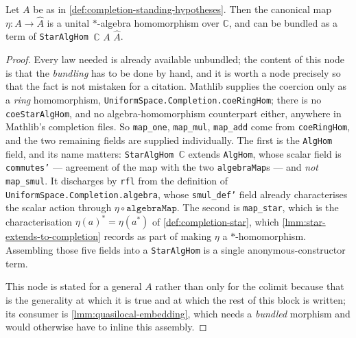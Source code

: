 \begin{lemma}
    \label{lmm:completion-coe-star-alg-hom}
    \leanok
    Let $A$ be as in \ref{def:completion-standing-hypotheses}. Then the canonical map $\eta : A \to \widehat{A}$ is a unital $*$-algebra homomorphism over $\mathbb{C}$, and can be bundled as a term of \texttt{StarAlgHom \ensuremath{\mathbb{C}}} $A$ $\widehat{A}$.
\end{lemma}
\begin{proof}
    \leanok
    Every law needed is already available unbundled; the content of this node is that the \emph{bundling} has to be done by hand, and it is worth a node precisely so that the fact is not mistaken for a citation. Mathlib supplies the coercion only as a \emph{ring} homomorphism, \texttt{UniformSpace.Completion.coeRingHom}; there is no \texttt{coeStarAlgHom}, and no algebra-homomorphism counterpart either, anywhere in Mathlib's completion files. So \texttt{map\_one}, \texttt{map\_mul}, \texttt{map\_add} come from \texttt{coeRingHom}, and the two remaining fields are supplied individually. The first is the \texttt{AlgHom} field, and its name matters: \texttt{StarAlgHom \ensuremath{\mathbb{C}}} extends \texttt{AlgHom}, whose scalar field is \texttt{commutes'} --- agreement of the map with the two \texttt{algebraMap}s --- and \emph{not} \texttt{map\_smul}. It discharges by \texttt{rfl} from the definition of \texttt{UniformSpace.Completion.algebra}, whose \texttt{smul\_def'} field already characterises the scalar action through $\eta \circ \texttt{algebraMap}$. The second is \texttt{map\_star}, which is the characterisation $\eta(a)^{*} = \eta(a^{*})$ of \ref{def:completion-star}, which \ref{lmm:star-extends-to-completion} records as part of making $\eta$ a $*$-homomorphism. Assembling those five fields into a \texttt{StarAlgHom} is a single anonymous-constructor term.

    This node is stated for a general $A$ rather than only for the colimit because that is the generality at which it is true and at which the rest of this block is written; its consumer is \ref{lmm:quasilocal-embedding}, which needs a \emph{bundled} morphism and would otherwise have to inline this assembly.
\end{proof}

